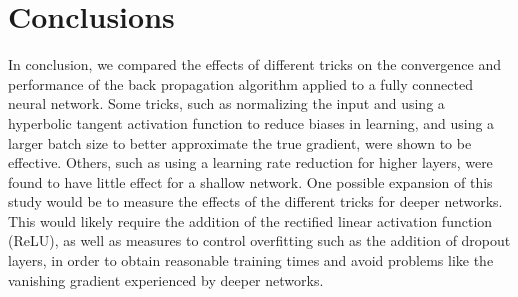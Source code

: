 \documentclass[journal,hidelinks]{IEEEtran}
\begin{document}
\section{Conclusions}

In conclusion, we compared the effects of different tricks on the convergence and performance of the back propagation algorithm applied to a fully connected neural network. Some tricks, such as normalizing the input and using a hyperbolic tangent activation function to reduce biases in learning, and using a larger batch size to better approximate the true gradient, were shown to be effective. Others, such as using a learning rate reduction for higher layers, were found to have little effect for a shallow network. One possible expansion of this study would be to measure the effects of the different tricks for deeper networks. This would likely require the addition of the rectified linear activation function (ReLU), as well as measures to control overfitting such as the addition of dropout layers, in order to obtain reasonable training times and avoid problems like the vanishing gradient experienced by deeper networks.



\end{document}

